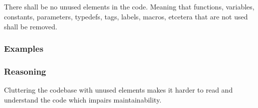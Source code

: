 \subsection*{\codingRule{}}

There shall be no unused elements in the code. Meaning that functions, variables, constants, parameters, typedefs, tags, labels, macros, etcetera that are not used shall be removed.

\subsubsection*{Examples}

\noindent
\begin{minipage}[t]{\codelstwidth\linewidth}
    
\end{minipage}
\hfill
\begin{minipage}[t]{\codelstwidth\linewidth}
    
\end{minipage}

\subsubsection*{Reasoning}

Cluttering the codebase with unused elements makes it harder to read and understand the code which impairs maintainability.